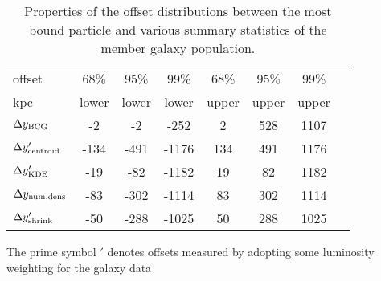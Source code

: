 \documentclass[usenatbib]{mn2e}
\begin{document}
{\begin{table}
	\begin{center}
	\caption{Properties of the offset distributions
		between the most bound particle and various summary statistics of 
		the member galaxy population.
	\label{tab:most_bound_particle_offset_distributions}}
\begin{tabular}{lccccccc}
\toprule
offset	      &  68\% 	&  95\% &  99\% &  68\% 	&  95\%  & 99\%  \\
kpc	      		& lower 	&  lower & lower &  upper 	&  upper & upper  \\
\midrule
$\Delta y_{\rm BCG}$       &       -2 &          -2 &        -252 &          2 &         528 &        1107 \\
$\Delta y_{\rm centroid}'$ &        -134 &        -491 &       -1176 &         134 &         491 &        1176 \\
$\Delta y_{\rm KDE}'$      &        -19 &         -82 &       -1182 &          19 &          82 &        1182 \\
$\Delta y_{\rm num.dens}$  &       -83 &        -302 &       -1114 &          83 &         302 &        1114 \\
$\Delta y_{\rm shrink}'$   &          -50 &        -288 &       -1025 &          50 &         288 &        1025 \\
\bottomrule
\end{tabular}
\end{center}
\footnotesize{The prime symbol $'$  denotes offsets measured by adopting some luminosity weighting for the galaxy 
data}
\end{table}


}
\end{document}
